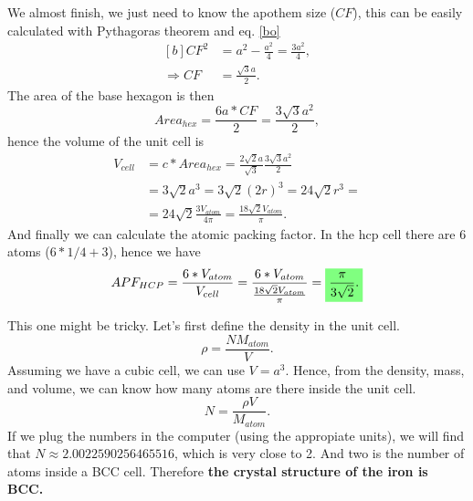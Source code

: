 \begin{questions}
\begin{solution}
We almost finish, we just need to know the apothem size ($CF$), this can be easily calculated with Pythagoras theorem and eq. \ref{bo}
\begin{equation}
  \begin{aligned}[b]
    CF^2 &= a^2 - \frac{a^2}{4} = \frac{3a^2}{4},\\
    \Rightarrow CF &= \frac{\sqrt{3}a}{2}.
  \end{aligned}
\end{equation}
The area of the base hexagon is then
\begin{equation}
  Area_{hex} = \frac{6a*CF}{2} =  \frac{3\sqrt{3}a^2}{2},
\end{equation}
hence the volume of the unit cell is
\begin{equation}
  \begin{aligned}
    V_{cell} &= c*Area_{hex} = \frac{2\sqrt{2}a}{\sqrt{3}}\frac{3\sqrt{3}a^2}{2} \\  &= 3\sqrt{2}a^3 = 3\sqrt{2}(2r)^3 = 24\sqrt{2}r^3 = \\
     &=24\sqrt{2}\frac{3V_{atom}}{4\pi} = \frac{18\sqrt{2}V_{atom}}{\pi}.
  \end{aligned}
\end{equation}
And finally we can calculate the atomic packing factor. In the hcp cell there are 6 atoms ($6*1/4 + 3$), hence we have
\begin{equation}
  APF_{HCP} = \frac{6*V_{atom}}{V_{cell}} = \frac{6*V_{atom}}{\frac{18\sqrt{2}V_{atom}}{\pi}} = \hlgreen{\frac{\pi}{3\sqrt{2}}.}
\end{equation}
\end{solution}

\begin{solution}
  This one might be tricky. Let's first define the density in the unit cell.
  \begin{equation}
    \rho = \frac{N M_{atom}}{V}.
  \end{equation}
  Assuming we have a cubic cell, we can use $V=a^3$. Hence, from the density, mass, and volume, we can know how many atoms are there inside the unit cell.
  \begin{equation}
    N = \frac{\rho V}{M_{atom}}.
  \end{equation}
  If we plug the numbers in the computer (using the appropiate units), we will find that $N\approx2.0022590256465516$, which is very close to 2. And two is the number of atoms inside a BCC cell. Therefore \textbf{the crystal structure of the iron is BCC.}
\end{solution}
\end{questions}

%
%
